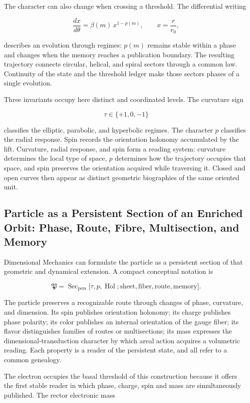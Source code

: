 The character can also change when crossing a threshold. The differential writing

\[
\frac{dx}{d\theta}
=
\beta(m)\,x^{1-p(m)},
\qquad x=\frac r{r_0},
\]

describes an evolution through regimes: \(p(m)\) remains stable within a phase and changes when the memory reaches a publication boundary. The resulting trajectory connects circular, helical, and spiral sectors through a common law. Continuity of the state and the threshold ledger make those sectors phases of a single evolution.

Three invariants occupy here distinct and coordinated levels. The curvature sign

\[
\tau\in\{+1,0,-1\}
\]

classifies the elliptic, parabolic, and hyperbolic regimes. The character \(p\) classifies the radial response. Spin records the orientation holonomy accumulated by the lift. Curvature, radial response, and spin form a reading system: curvature determines the local type of space, \(p\) determines how the trajectory occupies that space, and spin preserves the orientation acquired while traversing it. Closed and open curves then appear as distinct geometric biographies of the same oriented unit.

\subsection{Particle as a Persistent Section of an Enriched Orbit: Phase, Route, Fibre, Multisection, and Memory}

Dimensional Mechanics can formulate the particle as a persistent section of that geometric and dynamical extension. A compact conceptual notation is

\[
\mathfrak P
=
\operatorname{Sec}_{\mathrm{pers}}
\bigl[
\tau,p,\operatorname{Hol};
\text{sheet},\text{fiber},\text{route},\text{memory}
\bigr].
\]

The particle preserves a recognizable route through changes of phase, curvature, and dimension. Its spin publishes orientation holonomy; its charge publishes phase polarity; its color publishes an internal orientation of the gauge fiber; its flavor distinguishes families of routes or multisections; its mass expresses the dimensional-transduction character by which areal action acquires a volumetric reading. Each property is a reader of the persistent state, and all refer to a common genealogy.

The electron occupies the basal threshold of this construction because it offers the first stable reader in which phase, charge, spin and mass are simultaneously published. The rector electronic mass

